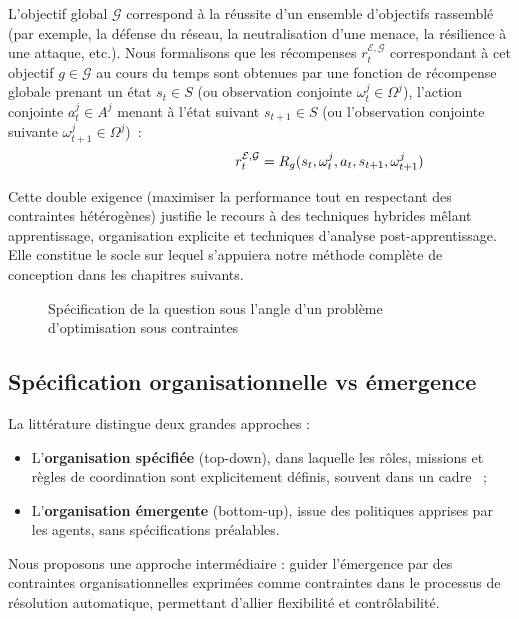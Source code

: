 \noindent L'objectif global $\mathcal{G}$ correspond à la réussite d'un ensemble d'objectifs rassemblé (par exemple, la défense du réseau, la neutralisation d'une menace, la résilience à une attaque, etc.). Nous formalisons que les récompenses $r^{\mathcal{E}, \mathcal{G}}_t$ correspondant à cet objectif $g \in \mathcal{G}$ au cours du temps sont obtenues par une fonction de récompense globale prenant un état $s_t \in S$ (ou observation conjointe $\omega^j_t \in \Omega^j$), l'action conjointe $a^j_t \in A^j$ menant à l'état suivant $s_{t+1} \in S$ (ou l'observation conjointe suivante $\omega^j_{t+1} \in \Omega^j$)~:
%
\[
  \hspace{3.5cm}r^{\mathcal{E}, \mathcal{G}}_t = R_{g}(s_t, \omega^j_t, a_t, s_{t+1}, \omega^j_{t+1})
\]

\noindent
Cette double exigence (maximiser la performance tout en respectant des contraintes hétérogènes) justifie le recours à des techniques hybrides mêlant apprentissage, organisation explicite et techniques d'analyse post-apprentissage. Elle constitue le socle sur lequel s'appuiera notre méthode complète de conception dans les chapitres suivants.

\begin{figure}[H]
  \centering
  \resizebox{\textwidth}{!}{%
    
  }
  \caption{Spécification de la question sous l'angle d'un problème d'optimisation sous contraintes}
  \label{fig:constrained_optimization_overview}
\end{figure}

\subsection{Spécification organisationnelle vs émergence}

La littérature distingue deux grandes approches :
\begin{itemize}
  \item L'\textbf{organisation spécifiée} (top-down), dans laquelle les rôles, missions et règles de coordination sont explicitement définis, souvent dans un cadre ~;
  \item L'\textbf{organisation émergente} (bottom-up), issue des politiques apprises par les agents, sans spécifications préalables.
\end{itemize}

Nous proposons une approche intermédiaire : guider l'émergence par des contraintes organisationnelles exprimées comme contraintes dans le processus de résolution automatique, permettant d'allier flexibilité et contrôlabilité.

